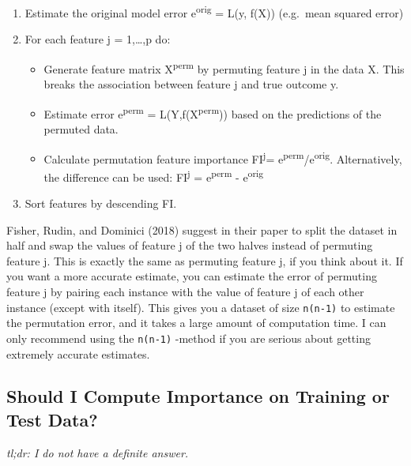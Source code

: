 \documentclass[12pt,]{krantz}
\providecommand{\tightlist}{%
  \setlength{\itemsep}{0pt}\setlength{\parskip}{0pt}}
\begin{document}
\begin{enumerate}
\def\labelenumi{\arabic{enumi}.}
\tightlist
\item
  Estimate the original model error e\textsuperscript{orig} = L(y, f(X))
  (e.g.~mean squared error)
\item
  For each feature j = 1,\ldots{},p do:

  \begin{itemize}
  \tightlist
  \item
    Generate feature matrix X\textsuperscript{perm} by permuting feature
    j in the data X. This breaks the association between feature j and
    true outcome y.
  \item
    Estimate error e\textsuperscript{perm} =
    L(Y,f(X\textsuperscript{perm})) based on the predictions of the
    permuted data.
  \item
    Calculate permutation feature importance FI\textsuperscript{j}=
    e\textsuperscript{perm}/e\textsuperscript{orig}. Alternatively, the
    difference can be used: FI\textsuperscript{j} =
    e\textsuperscript{perm} - e\textsuperscript{orig}
  \end{itemize}
\item
  Sort features by descending FI.
\end{enumerate}

Fisher, Rudin, and Dominici (2018) suggest in their paper to split the
dataset in half and swap the values of feature j of the two halves
instead of permuting feature j. This is exactly the same as permuting
feature j, if you think about it. If you want a more accurate estimate,
you can estimate the error of permuting feature j by pairing each
instance with the value of feature j of each other instance (except with
itself). This gives you a dataset of size \texttt{n(n-1)} to estimate
the permutation error, and it takes a large amount of computation time.
I can only recommend using the \texttt{n(n-1)} -method if you are
serious about getting extremely accurate estimates.

\subsection{Should I Compute Importance on Training or Test
Data?}\label{feature-importance-data}

\emph{tl;dr: I do not have a definite answer.}
\end{document}
